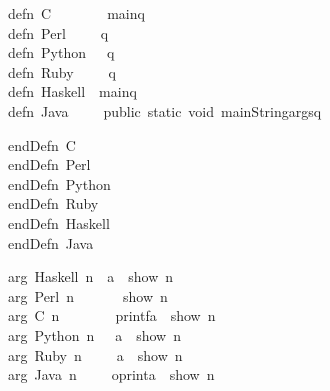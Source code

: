 \documentclass[12pt]{article}
\begin{document}
\begin{tabbing}\ttfamily
~~~defn~C~~~~~~~~mainq\\
\ttfamily ~~~defn~Perl~~~~~q\\
\ttfamily ~~~defn~Python~~~q\\
\ttfamily ~~~defn~Ruby~~~~~q\\
\ttfamily ~~~defn~Haskell~~mainq~\\
\ttfamily ~~~defn~Java~~~~~public~static~void~mainStringargsq
\end{tabbing}
\begin{tabbing}\ttfamily
~~~endDefn~C~~~~~~~~\\
\ttfamily ~~~endDefn~Perl~~~~~\\
\ttfamily ~~~endDefn~Python~~~\\
\ttfamily ~~~endDefn~Ruby~~~~~\\
\ttfamily ~~~endDefn~Haskell~~\\
\ttfamily ~~~endDefn~Java~~~~~
\end{tabbing}
\begin{tabbing}\ttfamily
~~~arg~Haskell~n~~a~~show~n\\
\ttfamily ~~~arg~Perl~n~~~~~~~show~n~~\\
\ttfamily ~~~arg~C~n~~~~~~~~printfa~~show~n~~\\
\ttfamily ~~~arg~Python~n~~~a~~show~n\\
\ttfamily ~~~arg~Ruby~n~~~~~a~~show~n\\
\ttfamily ~~~arg~Java~n~~~~~oprinta~~show~n~~
\end{tabbing}
\end{document}
